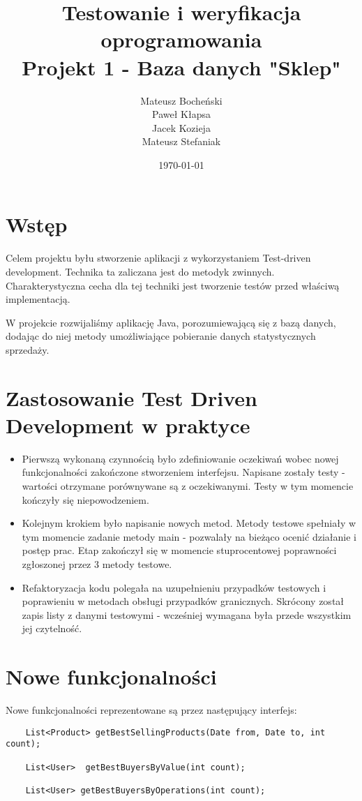 \documentclass[a4paper,11pt,notitlepage]{article}
\author{Mateusz Bocheński\\Paweł Kłapsa\\Jacek Kozieja\\Mateusz Stefaniak}
\title{Testowanie i weryfikacja oprogramowania \\ {\small Projekt 1 - Baza danych "Sklep"}}
\date{\today}
\begin{document}
\maketitle
\tableofcontents

\section{Wstęp}
Celem projektu byłu stworzenie aplikacji z wykorzystaniem Test-driven development. Technika ta zaliczana jest do metodyk zwinnych. Charakterystyczna cecha dla tej techniki jest tworzenie testów przed właściwą implementacją.

W projekcie rozwijaliśmy aplikację Java, porozumiewającą się z bazą danych, dodając do niej metody umożliwiające pobieranie danych statystycznych sprzedaży.
\section{Zastosowanie Test Driven Development w praktyce}
\begin{itemize}
\item Pierwszą wykonaną czynnością było zdefiniowanie oczekiwań wobec nowej funkcjonalności zakończone stworzeniem interfejsu. Napisane zostały testy - wartości otrzymane porównywane są z oczekiwanymi. Testy w tym momencie kończyły się niepowodzeniem.
\item Kolejnym krokiem było napisanie nowych metod. Metody testowe spełniały w tym momencie zadanie metody main - pozwalały na bieżąco ocenić działanie i postęp prac. Etap zakończył się w momencie stuprocentowej poprawności zgłoszonej przez 3 metody testowe.
\item Refaktoryzacja kodu polegała na uzupełnieniu przypadków testowych i poprawieniu w metodach obsługi przypadków granicznych. Skrócony został zapis listy z danymi testowymi - wcześniej wymagana była przede wszystkim jej czytelność.
\end{itemize}
\section{Nowe funkcjonalności}
Nowe funkcjonalności reprezentowane są przez następujący interfejs:
\begin{footnotesize}\begin{verbatim}
    List<Product> getBestSellingProducts(Date from, Date to, int count);

    List<User>  getBestBuyersByValue(int count);

    List<User> getBestBuyersByOperations(int count);
\end{verbatim}\end{footnotesize}
\end{document}
